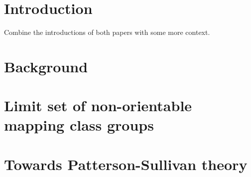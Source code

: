\documentclass[leqno, 12pt]{report} %
\numberwithin{equation}{section}
\numberwithin{theorem}{chapter}        %
\begin{document}





\chapter{Introduction}
\label{chap:introduction}
\setcounter{page}{1} %


Combine the introductions of both papers with some more context.

\chapter{Background}
\label{chap:background}


\chapter{Limit set of non-orientable mapping class groups}
\label{chap:limit-set-paper}







\chapter{Towards Patterson-Sullivan theory}
\label{chap:stat-convex-cocompact}









\newpage
{}
% 
\printbibliography
\end{document}
